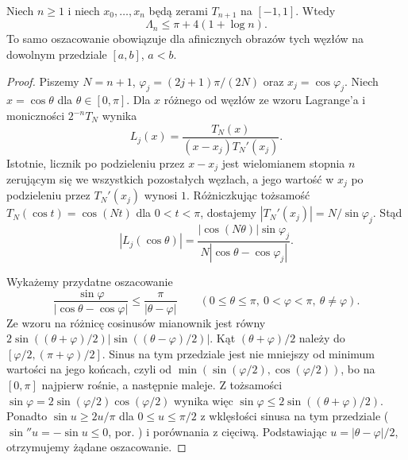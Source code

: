 \begin{twierdzenie}
\label{ma2:thm:approx-lebesgue-chebyshev}
Niech $n\ge1$ i niech $x_0,\ldots,x_n$
będą zerami $T_{n+1}$ na $[-1,1]$.
Wtedy
\[
 \Lambda_n\le \pi+4(1+\log n).
\]
To samo oszacowanie obowiązuje dla afinicznych
obrazów tych węzłów na dowolnym przedziale
$[a,b]$, $a<b$.
\end{twierdzenie}
\begin{proof}
Piszemy $N=n+1$,
$\varphi_j=(2j+1)\pi/(2N)$ oraz
$x_j=\cos\varphi_j$.
Niech $x=\cos\theta$ dla $\theta\in[0,\pi]$.
Dla $x$ różnego od węzłów ze wzoru Lagrange'a
i moniczności $2^{-n}T_N$ wynika
\[
 L_j(x)=\frac{T_N(x)}{(x-x_j)T_N'(x_j)}.
\]
Istotnie, licznik po podzieleniu przez
$x-x_j$ jest wielomianem stopnia $n$
zerującym się we wszystkich pozostałych
węzłach, a jego wartość w $x_j$ po
podzieleniu przez $T_N'(x_j)$ wynosi $1$.
Różniczkując tożsamość
$T_N(\cos t)=\cos(Nt)$ dla $0<t<\pi$,
dostajemy
$|T_N'(x_j)|=N/\sin\varphi_j$.
Stąd
\[
 |L_j(\cos\theta)|=
 \frac{|\cos(N\theta)|\sin\varphi_j}
 {N|\cos\theta-\cos\varphi_j|}.
\]

Wykażemy przydatne oszacowanie
\[
 \frac{\sin\varphi}{|\cos\theta-\cos\varphi|}
 \le\frac{\pi}{|\theta-\varphi|}
 \qquad
 (0\le\theta\le\pi,\ 0<\varphi<\pi,\
 \theta\ne\varphi).
\]
Ze wzoru na różnicę cosinusów mianownik
jest równy
$2\sin((\theta+\varphi)/2)
 |\sin((\theta-\varphi)/2)|$.
Kąt $(\theta+\varphi)/2$ należy do
$[\varphi/2,(\pi+\varphi)/2]$.
Sinus na tym przedziale jest nie mniejszy
od minimum wartości na jego końcach,
czyli od $\min(\sin(\varphi/2),\cos(\varphi/2))$,
bo na $[0,\pi]$ najpierw rośnie, a następnie maleje.
Z tożsamości $\sin\varphi=2\sin(\varphi/2)
\cos(\varphi/2)$ wynika więc
$\sin\varphi\le2\sin((\theta+\varphi)/2)$.
Ponadto $\sin u\ge 2u/\pi$ dla $0\le u\le\pi/2$
z wklęsłości sinusa na tym przedziale
($\sin''u=-\sin u\le0$, por.
)
i porównania z cięciwą.
Podstawiając $u=|\theta-\varphi|/2$,
otrzymujemy żądane oszacowanie.


\end{proof}

